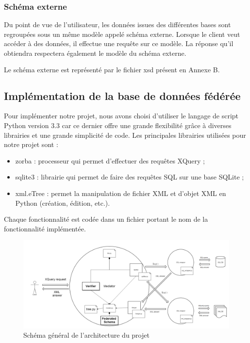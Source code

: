  \subsubsection{Schéma externe}

Du point de vue de l'utilisateur, les données issues des différentes bases sont regroupées sous un même modèle appelé schéma externe. Lorsque le client veut accéder à des données, il effectue une requête sur ce modèle. La réponse qu'il obtiendra respectera également le modèle du schéma externe.

Le schéma externe est représenté par le fichier xsd présent en Annexe B.

\subsection{Implémentation de la base de données fédérée}

Pour implémenter notre projet, nous avons choisi d'utiliser le langage de script Python version 3.3 car ce dernier offre une grande flexibilité grâce à diverses librairies et une grande simplicité de code. Les principales librairies utilisées pour notre projet sont :

\begin{itemize}
    \item zorba : processeur qui permet d'effectuer des requêtes XQuery ;

    \item sqlite3 : librairie qui permet de faire des requêtes SQL sur une base SQLite ;

    \item xml.eTree : permet la manipulation de fichier XML et d'objet XML en Python (création, édition, etc.).
\end{itemize}

Chaque fonctionnalité est codée dans un fichier portant le nom de la fonctionnalité implémentée.

\begin{figure}[h!]
    \centering
    \includegraphics[width=1\textwidth]{ressources/graphiques/architecture.png}
    \caption{Schéma général de l'architecture du projet}
\end{figure}

